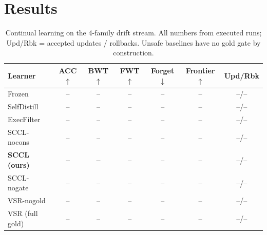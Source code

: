 \documentclass[10pt,conference]{IEEEtran}
\newcommand{\frozenacc}{--}\newcommand{\frozenbwt}{--}\newcommand{\frozenfwt}{--}%
\newcommand{\frozenforget}{--}\newcommand{\frozenupdates}{--}\newcommand{\frozenrollbacks}{--}\newcommand{\frozenfrontier}{--}%
\newcommand{\selfdistillacc}{--}\newcommand{\selfdistillbwt}{--}\newcommand{\selfdistillfwt}{--}%
\newcommand{\selfdistillforget}{--}\newcommand{\selfdistillupdates}{--}\newcommand{\selfdistillrollbacks}{--}\newcommand{\selfdistillfrontier}{--}%
\newcommand{\execfilteracc}{--}\newcommand{\execfilterbwt}{--}\newcommand{\execfilterfwt}{--}%
\newcommand{\execfilterforget}{--}\newcommand{\execfilterupdates}{--}\newcommand{\execfilterrollbacks}{--}\newcommand{\execfilterfrontier}{--}%
\newcommand{\scclnoconsacc}{--}\newcommand{\scclnoconsbwt}{--}\newcommand{\scclnoconsfwt}{--}%
\newcommand{\scclnoconsforget}{--}\newcommand{\scclnoconsupdates}{--}\newcommand{\scclnoconsrollbacks}{--}\newcommand{\scclnoconsfrontier}{--}%
\newcommand{\scclacc}{--}\newcommand{\scclbwt}{--}\newcommand{\scclfwt}{--}%
\newcommand{\scclforget}{--}\newcommand{\scclupdates}{--}\newcommand{\scclrollbacks}{--}\newcommand{\scclfrontier}{--}%
\newcommand{\scclnogateacc}{--}\newcommand{\scclnogatebwt}{--}\newcommand{\scclnogatefwt}{--}%
\newcommand{\scclnogateforget}{--}\newcommand{\scclnogateupdates}{--}\newcommand{\scclnogaterollbacks}{--}\newcommand{\scclnogatefrontier}{--}%
\newcommand{\vsrnogoldacc}{--}\newcommand{\vsrnogoldbwt}{--}\newcommand{\vsrnogoldfwt}{--}%
\newcommand{\vsrnogoldforget}{--}\newcommand{\vsrnogoldupdates}{--}\newcommand{\vsrnogoldrollbacks}{--}\newcommand{\vsrnogoldfrontier}{--}%
\newcommand{\vsracc}{--}\newcommand{\vsrbwt}{--}\newcommand{\vsrfwt}{--}%
\newcommand{\vsrforget}{--}\newcommand{\vsrupdates}{--}\newcommand{\vsrrollbacks}{--}\newcommand{\vsrfrontier}{--}%
\begin{document}
\section{Results}
\label{sec:results}
\begin{table}[htbp]
\centering
\caption{Continual learning on the 4-family drift stream. All numbers from executed runs; Upd/Rbk = accepted updates / rollbacks. Unsafe baselines have no gold gate by construction.}
\label{tab:ladder}
\begin{tabular}{lcccccc}
\toprule
Learner & ACC$\uparrow$ & BWT$\uparrow$ & FWT$\uparrow$ & Forget$\downarrow$ & Frontier$\uparrow$ & Upd/Rbk \\
\midrule
Frozen          & \frozenacc     & \frozenbwt     & \frozenfwt     & \frozenforget     & \frozenfrontier     & \frozenupdates/\frozenrollbacks \\
SelfDistill     & \selfdistillacc     & \selfdistillbwt     & \selfdistillfwt     & \selfdistillforget     & \selfdistillfrontier     & \selfdistillupdates/\selfdistillrollbacks \\
ExecFilter      & \execfilteracc     & \execfilterbwt     & \execfilterfwt     & \execfilterforget     & \execfilterfrontier     & \execfilterupdates/\execfilterrollbacks \\
SCCL-nocons     & \scclnoconsacc & \scclnoconsbwt & \scclnoconsfwt & \scclnoconsforget & \scclnoconsfrontier & \scclnoconsupdates/\scclnoconsrollbacks \\
\textbf{SCCL (ours)} & \textbf{\scclacc} & \textbf{\scclbwt} & \scclfwt & \scclforget & \scclfrontier & \scclupdates/\scclrollbacks \\
SCCL-nogate     & \scclnogateacc & \scclnogatebwt & \scclnogatefwt & \scclnogateforget & \scclnogatefrontier & \scclnogateupdates/\scclnogaterollbacks \\
VSR-nogold      & \vsrnogoldacc  & \vsrnogoldbwt  & \vsrnogoldfwt  & \vsrnogoldforget  & \vsrnogoldfrontier  & \vsrnogoldupdates/\vsrnogoldrollbacks \\
VSR (full gold)   & \vsracc        & \vsrbwt        & \vsrfwt        & \vsrforget        & \vsrfrontier        & \vsrupdates/\vsrrollbacks \\
\bottomrule
\end{tabular}
\end{table}
\end{document}
